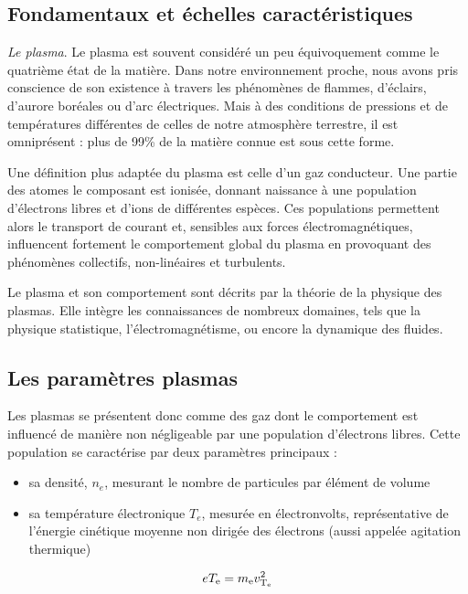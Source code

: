 \label{Introduction}
\begin{refsection}

\section{Fondamentaux et échelles caractéristiques}
\emph{Le plasma}. Le plasma est souvent considéré un peu équivoquement comme le
quatrième état de la matière. Dans notre environnement proche, nous avons pris
conscience de son existence à travers les phénomènes de flammes, d'éclairs,
d'aurore boréales ou d'arc électriques. Mais à des conditions de pressions et de
températures différentes de celles de notre atmosphère terrestre, il est
omniprésent : plus de 99\% de la matière connue est sous cette forme.

Une définition plus adaptée du plasma est celle d'un gaz conducteur. Une partie
des atomes le composant est ionisée, donnant naissance à une population
d'électrons libres et d'ions de différentes espèces. Ces populations permettent
alors le transport de courant et, sensibles aux forces électromagnétiques,
influencent fortement le comportement global du plasma en provoquant des
phénomènes collectifs, non-linéaires et turbulents.

Le plasma et son comportement sont décrits par la théorie de la physique des
plasmas. Elle intègre les connaissances de nombreux domaines, tels que la
physique statistique, l'électromagnétisme, ou encore la dynamique des fluides.

\subsection{Les paramètres plasmas}
Les plasmas se présentent donc comme des gaz dont le comportement est influencé
de manière non négligeable par une population d'électrons libres. Cette population
se caractérise par deux paramètres principaux :

\begin{itemize}
  \item sa densité, $n_e$, mesurant le nombre de particules par élément de volume
  \item sa température électronique $T_e$, mesurée en électronvolts, représentative
   de l'énergie cinétique moyenne non dirigée des électrons (aussi appelée
   agitation thermique)
\end{itemize}

\begin{equation}
	eT_\text{e}=m_\text{e} v_{\text{T}_\text{e}}^{{2}}
\end{equation}


\end{refsection}
